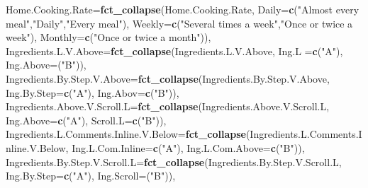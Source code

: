 \documentclass[
]{article}
\newenvironment{Shaded}{\begin{snugshade}}{\end{snugshade}}
\newcommand{\DataTypeTok}[1]{\textcolor[rgb]{0.13,0.29,0.53}{#1}}
\newcommand{\KeywordTok}[1]{\textcolor[rgb]{0.13,0.29,0.53}{\textbf{#1}}}
\newcommand{\NormalTok}[1]{#1}
\newcommand{\StringTok}[1]{\textcolor[rgb]{0.31,0.60,0.02}{#1}}
\begin{document}
\begin{Shaded}
\begin{Highlighting}[]
                  \DataTypeTok{Home.Cooking.Rate=}\KeywordTok{fct_collapse}\NormalTok{(Home.Cooking.Rate,}
                                                 \DataTypeTok{Daily=}\KeywordTok{c}\NormalTok{(}\StringTok{"Almost every meal"}\NormalTok{,}\StringTok{"Daily"}\NormalTok{,}\StringTok{"Every meal"}\NormalTok{),}
                                                 \DataTypeTok{Weekly=}\KeywordTok{c}\NormalTok{(}\StringTok{"Several times a week"}\NormalTok{,}\StringTok{"Once or twice a week"}\NormalTok{),}
                                                 \DataTypeTok{Monthly=}\KeywordTok{c}\NormalTok{(}\StringTok{"Once or twice a month"}\NormalTok{)),}
                  \DataTypeTok{Ingredients.L.V.Above=}\KeywordTok{fct_collapse}\NormalTok{(Ingredients.L.V.Above,}
                                                     \DataTypeTok{Ing.L =}\KeywordTok{c}\NormalTok{(}\StringTok{"A"}\NormalTok{),}
                                                     \DataTypeTok{Ing.Above=}\NormalTok{(}\StringTok{"B"}\NormalTok{)),}
                  \DataTypeTok{Ingredients.By.Step.V.Above=}\KeywordTok{fct_collapse}\NormalTok{(Ingredients.By.Step.V.Above,}
                                                           \DataTypeTok{Ing.By.Step=}\KeywordTok{c}\NormalTok{(}\StringTok{"A"}\NormalTok{),}
                                                           \DataTypeTok{Ing.Abov=}\KeywordTok{c}\NormalTok{(}\StringTok{"B"}\NormalTok{)),}
                  \DataTypeTok{Ingredients.Above.V.Scroll.L=}\KeywordTok{fct_collapse}\NormalTok{(Ingredients.Above.V.Scroll.L,}
                                                            \DataTypeTok{Ing.Above=}\KeywordTok{c}\NormalTok{(}\StringTok{"A"}\NormalTok{),}
                                                            \DataTypeTok{Scroll.L=}\KeywordTok{c}\NormalTok{(}\StringTok{"B"}\NormalTok{)),}
                  \DataTypeTok{Ingredients.L.Comments.Inline.V.Below=}\KeywordTok{fct_collapse}\NormalTok{(Ingredients.L.Comments.Inline.V.Below,}
                                                                     \DataTypeTok{Ing.L.Com.Inline=}\KeywordTok{c}\NormalTok{(}\StringTok{"A"}\NormalTok{),}
                                                                     \DataTypeTok{Ing.L.Com.Above=}\KeywordTok{c}\NormalTok{(}\StringTok{"B"}\NormalTok{)),}
                  \DataTypeTok{Ingredients.By.Step.V.Scroll.L=}\KeywordTok{fct_collapse}\NormalTok{(Ingredients.By.Step.V.Scroll.L,}
                                                              \DataTypeTok{Ing.By.Step=}\KeywordTok{c}\NormalTok{(}\StringTok{"A"}\NormalTok{),}
                                                              \DataTypeTok{Ing.Scroll=}\NormalTok{(}\StringTok{"B"}\NormalTok{)),}

\end{Highlighting}
\end{Shaded}
\end{document}
